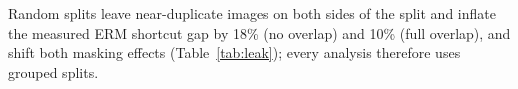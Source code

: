 Random splits leave near-duplicate images on both sides of the split and inflate the measured ERM shortcut gap by 18\% (no overlap) and 10\% (full overlap), and shift both masking effects (Table~\ref{tab:leak}); every analysis therefore uses grouped splits.%
